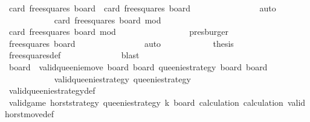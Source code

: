 \begin{isabellebody}
\ {\isachardoublequoteopen}card\ {\isacharparenleft}free{\isacharunderscore}squares\ board{\isacharparenright}\ {\isacharequal}\ card\ {\isacharparenleft}free{\isacharunderscore}squares\ {\isacharquery}board{}{\isacharparenright}\ {\isacharplus}\ {}{\isachardoublequoteclose}\isanewline
\ \ \ \ \ \ \ \ \ \ \ \ \isamarkupfalse%
\ auto\isanewline
\ \ \ \ \ \ \ \ \ \ \isamarkupfalse%
\ {\isachardoublequoteopen}card\ {\isacharparenleft}free{\isacharunderscore}squares\ {\isacharquery}board{}{\isacharparenright}\ mod\ {}\ {\isacharequal}\ {}{\isachardoublequoteclose}\isanewline
\ \ \ \ \ \ \ \ \ \ \ \ \isamarkupfalse%
\ {\isacharbackquoteopen}card\ {\isacharparenleft}free{\isacharunderscore}squares\ board{\isacharparenright}\ mod\ {}\ {\isacharequal}\ {}{\isacharbackquoteclose}\isanewline
\ \ \ \ \ \ \ \ \ \ \ \ \isamarkupfalse%
\ presburger\isanewline
\ \ \ \ \ \ \ \ \ \ \isamarkupfalse%
\ {\isachardoublequoteopen}free{\isacharunderscore}squares\ {\isacharquery}board{}\ {\isasymnoteq}\ {\isacharbraceleft}{\isacharbraceright}{\isachardoublequoteclose}\isanewline
\ \ \ \ \ \ \ \ \ \ \ \ \isamarkupfalse%
\ auto\isanewline
\ \ \ \ \ \ \ \ \ \ \isamarkupfalse%
\ {\isacharquery}thesis\isanewline
\ \ \ \ \ \ \ \ \ \ \ \ \isamarkupfalse%
\ free{\isacharunderscore}squares{\isacharunderscore}def\isanewline
\ \ \ \ \ \ \ \ \ \ \ \ \isamarkupfalse%
\ blast\isanewline
\ \ \ \ \ \ \ \ \isamarkupfalse%
\isanewline
\isanewline
\ \ \ \ \ \ \ \ \isamarkupfalse%
\ \isamarkupfalse%
\ board{}\ \ {\isachardoublequoteopen}valid{\isacharunderscore}queenie{\isacharunderscore}move\ {\isacharquery}board{}\ board{}{\isachardoublequoteclose}\ {\isachardoublequoteopen}queenie{\isacharunderscore}strategy\ {\isacharquery}board{}\ board{}{\isachardoublequoteclose}\isanewline
\ \ \ \ \ \ \ \ \ \ \isamarkupfalse%
\ {\isacharbackquoteopen}valid{\isacharunderscore}queenie{\isacharunderscore}strategy\ queenie{\isacharunderscore}strategy{\isacharbackquoteclose}\isanewline
\ \ \ \ \ \ \ \ \ \ \isamarkupfalse%
\ valid{\isacharunderscore}queenie{\isacharunderscore}strategy{\isacharunderscore}def\isanewline
\ \ \ \ \ \ \ \ \ \ \isamarkupfalse%
\ {\isacartoucheopen}valid{\isacharunderscore}game\ {\isacharquery}horst{\isacharunderscore}strategy\ queenie{\isacharunderscore}strategy\ k\ board{\isacartoucheclose}\ calculation{\isacharparenleft}{}{\isacharparenright}\ calculation{\isacharparenleft}{}{\isacharparenright}\ valid{\isacharunderscore}horst{\isacharunderscore}move{\isacharprime}{\isacharunderscore}def\ \isanewline

\end{isabellebody}
